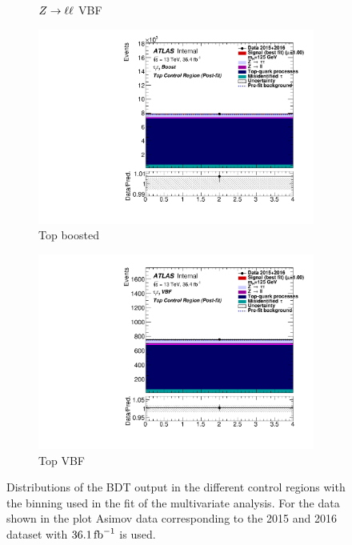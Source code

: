 \begin{figure}[htb]
\begin{subfigure}[t]{0.45\textwidth}
        \caption{$Z \to \ell \ell$ VBF}
    \end{subfigure}
    \begin{subfigure}[t]{0.45\textwidth}
        \includegraphics[width=\textwidth]{./plots/fit/mva/top_boost.pdf}
        \caption{Top boosted}
    \end{subfigure}
    \begin{subfigure}[t]{0.45\textwidth}
        \includegraphics[width=\textwidth]{./plots/fit/mva/top_vbf.pdf}
        \caption{Top VBF}
    \end{subfigure}
    \caption{Distributions of the BDT output in the different control regions with the binning used in the fit of the multivariate analysis.
             For the data shown in the plot Asimov data corresponding to the 2015 and 2016 dataset with $\SI{36.1}{\invfb}$ is used.}\label{fig:fit:input:mva:CR}
\end{figure}

